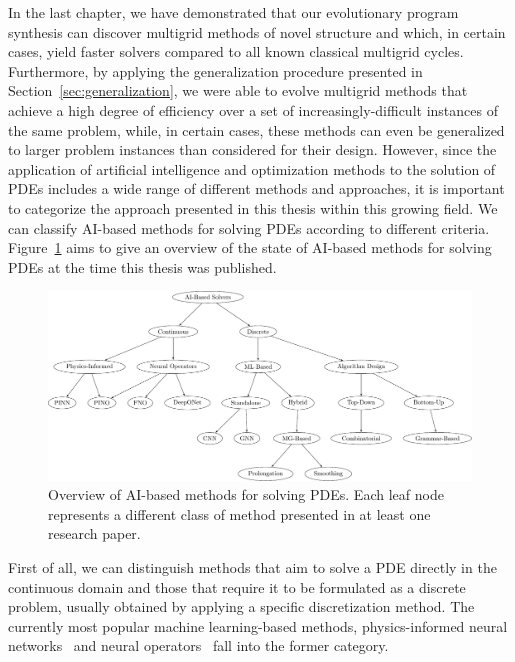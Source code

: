 In the last chapter, we have demonstrated that our evolutionary program synthesis can discover multigrid methods of novel structure and which, in certain cases, yield faster solvers compared to all known classical multigrid cycles.
Furthermore, by applying the generalization procedure presented in  Section~\ref{sec:generalization}, we were able to evolve multigrid methods that achieve a high degree of efficiency over a set of increasingly-difficult instances of the same problem, while, in certain cases, these methods can even be generalized to larger problem instances than considered for their design.
However, since the application of artificial intelligence and optimization methods to the solution of PDEs includes a wide range of different methods and approaches, it is important to categorize the approach presented in this thesis within this growing field.
We can classify AI-based methods for solving PDEs according to different criteria.
Figure~\ref{fig:overview-ai-based-methods} aims to give an overview of the state of AI-based methods for solving PDEs at the time this thesis was published.
\begin{figure}
	\includegraphics[width=\textwidth]{figures/trees/related_work.pdf}
	\caption{Overview of AI-based methods for solving PDEs. Each leaf node represents a different class of method presented in at least one research paper.}
	\label{fig:overview-ai-based-methods}
\end{figure}
First of all, we can distinguish methods that aim to solve a PDE directly in the continuous domain and those that require it to be formulated as a discrete problem, usually obtained by applying a specific discretization method.
The currently most popular machine learning-based methods, physics-informed neural networks~\cite{karniadakis2021physics,raissi2019physics,kharazmi2019variational,kharazmi2021hp} and neural operators~\cite{li2020fourier,guibas2021efficient,lu2021learning,li2021physics} fall into the former category.
